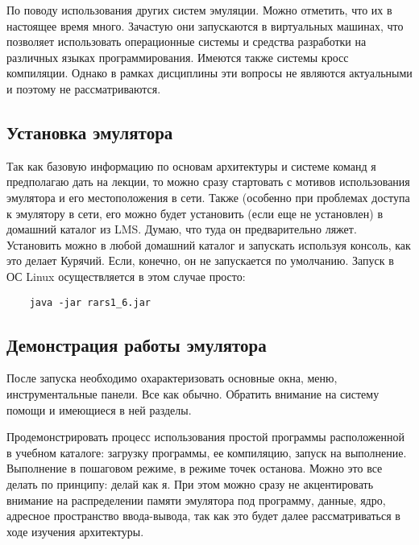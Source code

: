 По поводу использования других систем эмуляции. Можно отметить, что их в настоящее время много. Зачастую они запускаются в виртуальных машинах, что позволяет использовать операционные системы и средства разработки на различных языках программирования. Имеются также системы кросс компиляции. Однако в рамках дисциплины эти вопросы не являются актуальными и поэтому не рассматриваются.

\subsection{Установка эмулятора}

Так как базовую информацию по основам архитектуры и системе команд я предполагаю дать на лекции, то можно сразу стартовать с мотивов использования эмулятора и его местоположения в сети. Также (особенно при проблемах доступа к эмулятору в сети, его можно будет установить (если еще не установлен) в домашний каталог из LMS. Думаю, что туда он предварительно ляжет.
Установить можно в любой домашний каталог и запускать используя консоль, как это делает Курячий. Если, конечно, он не запускается по умолчанию. Запуск в ОС Linux осуществляется в этом случае просто:
\begin{verbatim}
    java -jar rars1_6.jar
\end{verbatim}


\subsection{Демонстрация работы эмулятора}
После запуска необходимо охарактеризовать основные окна, меню, инструментальные панели. Все как обычно. Обратить внимание на систему помощи и имеющиеся в ней разделы.

Продемонстрировать процесс использования простой программы расположенной в учебном каталоге: загрузку программы, ее компиляцию, запуск на выполнение. Выполнение в пошаговом режиме, в режиме точек останова. Можно это все делать по принципу: делай как я. При этом можно сразу не акцентировать внимание на распределении памяти эмулятора под программу, данные, ядро, адресное пространство ввода-вывода, так как это будет далее рассматриваться в ходе изучения архитектуры.

